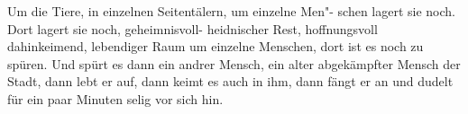 Um die Tiere, in einzelnen Seitentälern, um einzelne Men"-%
schen lagert sie noch. Dort lagert sie noch, geheimnisvoll-%
heidnischer Rest, hoffnungsvoll dahinkeimend, lebendiger
Raum um einzelne Menschen, dort ist es noch zu spüren.
Und spürt es dann ein andrer Mensch, ein alter abgekämpfter
Mensch der Stadt, dann lebt er auf, dann keimt es auch in
ihm, dann fängt er an und dudelt für ein paar Minuten
selig vor sich hin.